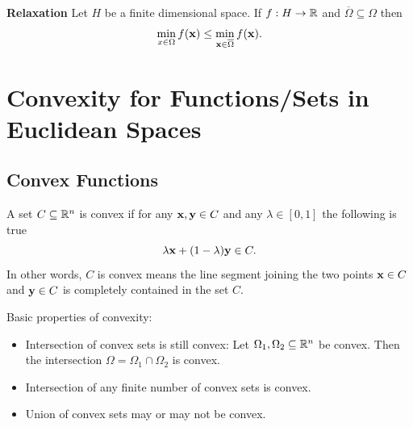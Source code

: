 
\textbf{Relaxation} Let \(H\) be a finite dimensional space. If \(f : H \to \mathbb{R}\) and \(\overline{\Omega} \subseteq \Omega\) then
\[\min_{x \in \Omega} f(\mathbf{x}) \leq \min_{\mathbf{x} \in \overline{\Omega}} f(\mathbf{x}).\]

\section{Convexity for Functions/Sets in Euclidean Spaces}

\subsection{Convex Functions}

\begin{definition}
    A set \(C \subseteq \mathbb{R}^n\) is convex if for any \(\mathbf{x}, \mathbf{y} \in C\) and any \(\lambda \in [0, 1]\) the following is true
    \[\lambda \mathbf{x} + (1 - \lambda)\mathbf{y} \in C.\]
    In other words, \(C\) is convex means the line segment joining the two points \(\mathbf{x} \in C\) and \(\mathbf{y} \in C\) is completely contained in the set \(C\).
\end{definition}

Basic properties of convexity:
\begin{itemize}
    \item Intersection of convex sets is still convex: Let \(\Omega_1, \Omega_2 \subseteq \mathbb{R}^n\) be convex. Then the intersection \(\Omega = \Omega_1 \cap \Omega_2\) is convex.
    \item Intersection of any finite number of convex sets is convex.
    \item Union of convex sets may or may not be convex.
\end{itemize}


